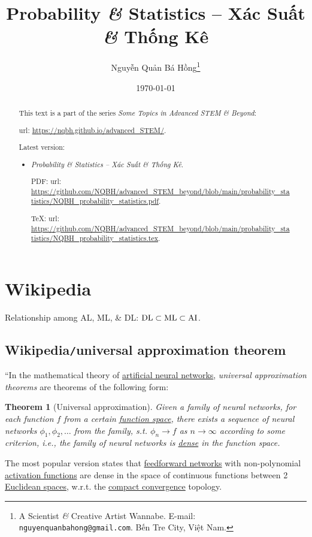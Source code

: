 \documentclass{article}
\title{Probability {\it\&} Statistics -- Xác Suất {\it\&} Thống Kê}
\author{Nguyễn Quản Bá Hồng\footnote{A Scientist {\it\&} Creative Artist Wannabe. E-mail: {\tt nguyenquanbahong@gmail.com}. Bến Tre City, Việt Nam.}}
\date{\today}
\newtheorem{theorem}{Theorem}
\begin{document}
\maketitle
\begin{abstract}
	This text is a part of the series {\it Some Topics in Advanced STEM \& Beyond}:
	
	{\sc url}: \url{https://nqbh.github.io/advanced_STEM/}.
	
	Latest version:
	\begin{itemize}
		\item {\it Probability \& Statistics -- Xác Suất \& Thống Kê}.
		
		PDF: {\sc url}: \url{https://github.com/NQBH/advanced_STEM_beyond/blob/main/probability_statistics/NQBH_probability_statistics.pdf}.
		
		\TeX: {\sc url}: \url{https://github.com/NQBH/advanced_STEM_beyond/blob/main/probability_statistics/NQBH_probability_statistics.tex}.
	\end{itemize}
\end{abstract}
\tableofcontents


\section{Wikipedia}
{\sf Relationship among AL, ML, \& DL}: $\rm DL\subset ML\subset AI$.

\subsection{Wikipedia{\tt/}universal approximation theorem}
``In the mathematical theory of \href{https://en.wikipedia.org/wiki/Artificial_neural_networks}{artificial neural networks}, {\it universal approximation theorems} are theorems of the following form:

\begin{theorem}[Universal approximation]
	Given a family of neural networks, for each function $f$ from a certain \href{https://en.wikipedia.org/wiki/Function_space}{function space}, there exists a sequence of neural networks $\phi_1,\phi_2,\ldots$ from the family, s.t. $\phi_n\to f$ as $n\to\infty$ according to some criterion, i.e., the family of neural networks is \href{https://en.wikipedia.org/wiki/Dense_set}{dense} in the function space.
\end{theorem}
The most popular version states that \href{https://en.wikipedia.org/wiki/Feedforward_neural_network}{feedforward networks} with non-polynomial \href{https://en.wikipedia.org/wiki/Activation_function}{activation functions} are dense in the space of continuous functions between 2 \href{https://en.wikipedia.org/wiki/Euclidean_space}{Euclidean spaces}, w.r.t. the \href{https://en.wikipedia.org/wiki/Compact_convergence}{compact convergence} topology.
\end{document}
